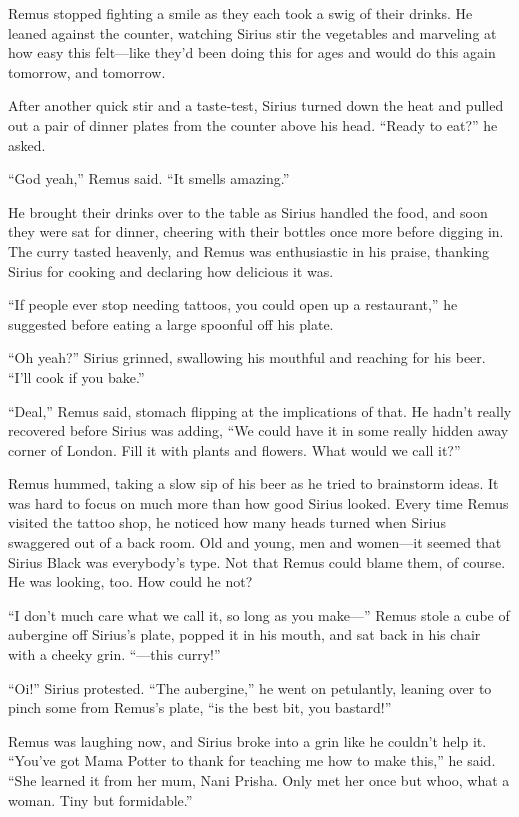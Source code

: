 Remus stopped fighting a smile as they each took a swig of their drinks. He leaned against the counter, watching Sirius stir the vegetables and marveling at how easy this felt—like they’d been doing this for ages and would do this again tomorrow, and tomorrow.

After another quick stir and a taste-test, Sirius turned down the heat and pulled out a pair of dinner plates from the counter above his head. “Ready to eat?” he asked.

“God yeah,” Remus said. “It smells amazing.”

He brought their drinks over to the table as Sirius handled the food, and soon they were sat for dinner, cheering with their bottles once more before digging in. The curry tasted heavenly, and Remus was enthusiastic in his praise, thanking Sirius for cooking and declaring how delicious it was.

“If people ever stop needing tattoos, you could open up a restaurant,” he suggested before eating a large spoonful off his plate.

“Oh yeah?” Sirius grinned, swallowing his mouthful and reaching for his beer. “I’ll cook if you bake.”

“Deal,” Remus said, stomach flipping at the implications of that. He hadn’t really recovered before Sirius was adding, “We could have it in some really hidden away corner of London. Fill it with plants and flowers. What would we call it?”

Remus hummed, taking a slow sip of his beer as he tried to brainstorm ideas. It was hard to focus on much more than how good Sirius looked. Every time Remus visited the tattoo shop, he noticed how many heads turned when Sirius swaggered out of a back room. Old and young, men and women—it seemed that Sirius Black was everybody’s type. Not that Remus could blame them, of course. He was looking, too. How could he not?

“I don’t much care what we call it, so long as you make—” Remus stole a cube of aubergine off Sirius’s plate, popped it in his mouth, and sat back in his chair with a cheeky grin. “—this curry!”

“Oi!” Sirius protested. “The aubergine,” he went on petulantly, leaning over to pinch some from Remus’s plate, “is the best bit, you bastard!”

Remus was laughing now, and Sirius broke into a grin like he couldn’t help it. “You’ve got Mama Potter to thank for teaching me how to make this,” he said. “She learned it from her mum, Nani Prisha. Only met her once but whoo, what a woman. Tiny but formidable.”

